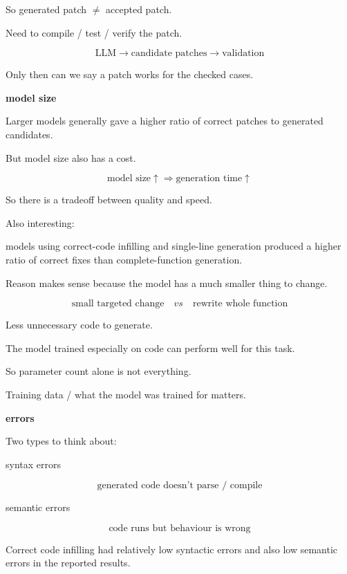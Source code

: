 \documentclass[11pt]{article}
\begin{document}
So generated patch $\neq$ accepted patch.

Need to compile / test / verify the patch.

\[
\text{LLM}
\rightarrow
\text{candidate patches}
\rightarrow
\text{validation}
\]

Only then can we say a patch works for the checked
cases.

\vspace{8pt}

\textbf{model size}

Larger models generally gave a higher ratio of
correct patches to generated candidates.

But model size also has a cost.

\[
\text{model size}\uparrow
\Rightarrow
\text{generation time}\uparrow
\]

So there is a tradeoff between quality and speed.

\vspace{7pt}

Also interesting:

models using correct-code infilling and single-line
generation produced a higher ratio of correct fixes
than complete-function generation.

Reason makes sense because the model has a much
smaller thing to change.

\[
\text{small targeted change}
\quad vs \quad
\text{rewrite whole function}
\]

Less unnecessary code to generate.

\vspace{8pt}

The model trained especially on code can perform
well for this task.

So parameter count alone is not everything.

Training data / what the model was trained for matters.

\vspace{8pt}

\textbf{errors}

Two types to think about:

syntax errors

\[
\text{generated code doesn't parse / compile}
\]

semantic errors

\[
\text{code runs but behaviour is wrong}
\]

Correct code infilling had relatively low syntactic
errors and also low semantic errors in the reported
results.
\end{document}
